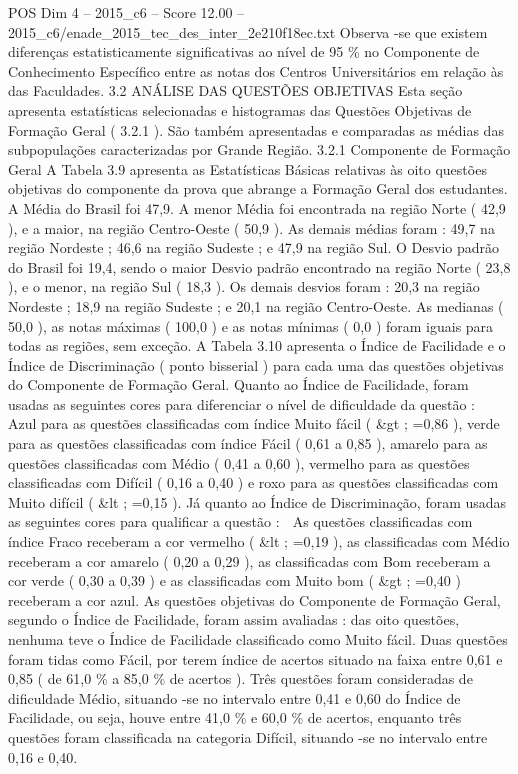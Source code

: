 \begin{textsample}{POS Dim 4 – 2015\_c6 – Score 12.00 – 2015\_c6/enade\_2015\_tec\_des\_inter\_2e210f18ec.txt}
Observa -se que existem diferenças estatisticamente significativas ao nível de 95 \% no Componente de Conhecimento Específico entre as notas dos Centros Universitários em relação às das Faculdades. 3.2 ANÁLISE DAS QUESTÕES OBJETIVAS Esta seção apresenta estatísticas selecionadas e histogramas das Questões Objetivas de Formação Geral ( 3.2.1 ).
São também apresentadas e comparadas as médias das subpopulações caracterizadas por Grande Região. 3.2.1 Componente de Formação Geral A Tabela 3.9 apresenta as Estatísticas Básicas relativas às oito questões objetivas do componente da prova que abrange a Formação Geral dos estudantes.
A Média do Brasil foi 47,9.
A menor Média foi encontrada na região Norte ( 42,9 ), e a maior, na região Centro-Oeste ( 50,9 ).
As demais médias foram : 49,7 na região Nordeste ; 46,6 na região Sudeste ; e 47,9 na região Sul.
O Desvio padrão do Brasil foi 19,4, sendo o maior Desvio padrão encontrado na região Norte ( 23,8 ), e o menor, na região Sul ( 18,3 ).
Os demais desvios foram : 20,3 na região Nordeste ; 18,9 na região Sudeste ; e 20,1 na região Centro-Oeste.
As medianas ( 50,0 ), as notas máximas ( 100,0 ) e as notas mínimas ( 0,0 ) foram iguais para todas as regiões, sem exceção.
A Tabela 3.10 apresenta o Índice de Facilidade e o Índice de Discriminação ( ponto bisserial ) para cada uma das questões objetivas do Componente de Formação Geral.
Quanto ao Índice de Facilidade, foram usadas as seguintes cores para diferenciar o nível de dificuldade da questão :  Azul para as questões classificadas com índice Muito fácil ( \&gt ; =0,86 ), verde para as questões classificadas com índice Fácil ( 0,61 a 0,85 ), amarelo para as questões classificadas com Médio ( 0,41 a 0,60 ), vermelho para as questões classificadas com Difícil ( 0,16 a 0,40 ) e roxo para as questões classificadas com Muito difícil ( \&lt ; =0,15 ).
Já quanto ao Índice de Discriminação, foram usadas as seguintes cores para qualificar a questão :  As questões classificadas com índice Fraco receberam a cor vermelho ( \&lt ; =0,19 ), as classificadas com Médio receberam a cor amarelo ( 0,20 a 0,29 ), as classificadas com Bom receberam a cor verde ( 0,30 a 0,39 ) e as classificadas com Muito bom ( \&gt ; =0,40 ) receberam a cor azul.
As questões objetivas do Componente de Formação Geral, segundo o Índice de Facilidade, foram assim avaliadas : das oito questões, nenhuma teve o Índice de Facilidade classificado como Muito fácil.
Duas questões foram tidas como Fácil, por terem índice de acertos situado na faixa entre 0,61 e 0,85 ( de 61,0 \% a 85,0 \% de acertos ).
Três questões foram consideradas de dificuldade Médio, situando -se no intervalo entre 0,41 e 0,60 do Índice de Facilidade, ou seja, houve entre 41,0 \% e 60,0 \% de acertos, enquanto três questões foram classificada na categoria Difícil, situando -se no intervalo entre 0,16 e 0,40.

\end{textsample}
